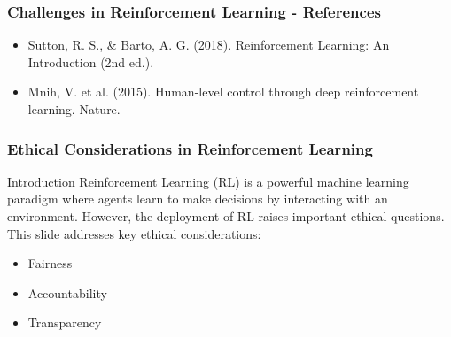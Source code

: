 \documentclass[aspectratio=169]{beamer}
\begin{document}
\begin{frame}[fragile]
    \frametitle{Challenges in Reinforcement Learning - References}
    \begin{itemize}
        \item Sutton, R. S., \& Barto, A. G. (2018). Reinforcement Learning: An Introduction (2nd ed.).
        \item Mnih, V. et al. (2015). Human-level control through deep reinforcement learning. Nature.
    \end{itemize}
\end{frame}

\begin{frame}[fragile]
    \frametitle{Ethical Considerations in Reinforcement Learning}
    \begin{block}{Introduction}
        Reinforcement Learning (RL) is a powerful machine learning paradigm where agents learn to make decisions by interacting with an environment. However, the deployment of RL raises important ethical questions. This slide addresses key ethical considerations: 
        \begin{itemize}
            \item Fairness
            \item Accountability
            \item Transparency
        \end{itemize}
    \end{block}
\end{frame}
\end{document}
